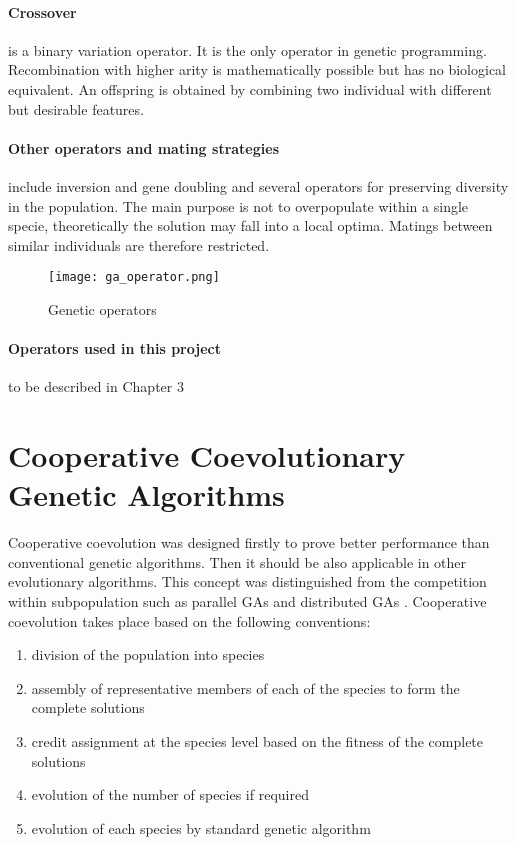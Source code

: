 \paragraph{Crossover} is a binary variation operator. It is the only operator in genetic programming. Recombination with higher arity is mathematically possible but has no biological equivalent. An offspring is obtained by combining two individual with different but desirable features. 

\paragraph{Other operators and mating strategies} include inversion and gene doubling and several operators for preserving diversity in the population. The main purpose is not to overpopulate within a single specie, theoretically the solution may fall into a local optima. Matings between similar individuals are therefore restricted.

\begin{figure}[h]%
\centering
\texttt{[image: ga\_operator.png]}
\caption{Genetic operators}
\label{fig:ga_operator}
\end{figure}

\paragraph{Operators used in this project} to be described in Chapter 3

\section{Cooperative Coevolutionary Genetic Algorithms}
\label{sec:ccga}

Cooperative coevolution was designed firstly to prove better performance than conventional genetic algorithms. Then it should be also applicable in other evolutionary algorithms. This concept was distinguished from the competition within subpopulation such as parallel GAs \cite{grosso1985} and distributed GAs \cite{whitley1990}. Cooperative coevolution takes place based on the following conventions:
\begin{enumerate}
\item division of the population into species
\item assembly of representative members of each of the species to form the complete solutions
\item credit assignment at the species level based on the fitness of the complete solutions
\item evolution of the number of species if required
\item evolution of each species by standard genetic algorithm
\end{enumerate}

